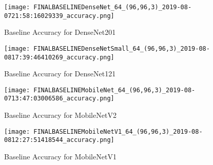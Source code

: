 \begin{figure}
  \centering
  \texttt{[image: FINALBASELINEDenseNet\_64\_(96,96,3)\_2019-08-0721:58:16029339\_accuracy.png]}
  \caption{Baseline Accuracy for DenseNet201}
  \label{fig:baseAccDense201}
\end{figure}



\begin{figure}
  \centering
  \texttt{[image: FINALBASELINEDenseNetSmall\_64\_(96,96,3)\_2019-08-0817:39:46410269\_accuracy.png]}
  \caption{Baseline Accuracy for DenseNet121}
  \label{fig:baseAccDense121}
\end{figure}



\begin{figure}
  \centering
  \texttt{[image: FINALBASELINEMobileNet\_64\_(96,96,3)\_2019-08-0713:47:03006586\_accuracy.png]}
  \caption{Baseline Accuracy for MobileNetV2}
  \label{fig:baseAccMobile2}
\end{figure}


%
\begin{figure}
  \centering
  \texttt{[image: FINALBASELINEMobileNetV1\_64\_(96,96,3)\_2019-08-0812:27:51418544\_accuracy.png]}
  \caption{Baseline Accuracy for MobileNetV1}
  \label{fig:baseAccMobile1}
\end{figure}

